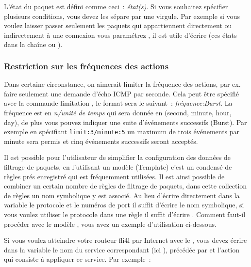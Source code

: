 L'état du paquet est défini comme ceci~: \emph{état(s)}.
Si vous souhaitez spécifier plusieurs conditions, vous devez les sépare par
une virgule. Par exemple si vous voulez laisser passer seulement les paquets
qui appartiennent directement ou indirectement à une connexion vous paramétrez
, il est utile d'écrire
(ces états dans la chaîne  ou ).

\subsubsection{Restriction sur les fréquences des actions}

Dans certaine circonstance, on aimerait limiter la fréquence des actions,
par ex. faire seulement une demande d'écho ICMP par seconde. Cela peut être
spécifié avec la commande limitation , le format sera le
suivant~: \emph{fréquence:Burst}. La fréquence est en
\emph{n/unité de temps} qui sera donnée en (second, minute, hour, day), de plus
vous pouvez indiquer une suite d'événements successifs (Burst). Par exemple en
spécifiant \texttt{limit:3/minute:5} un maximum de trois événements par minute
sera permis et cinq événements successifs seront acceptés.


Il est possible pour l'utilisateur de simplifier la configuration des données
de filtrage de paquets, en l'utilisant un modèle (Template) c'est un condensé
de règles prés enregistré qui est fréquemment utilisées. Il est ainsi possible de
combiner un certain nombre de règles de filtrage de paquets, dans cette
collection de règles un nom symbolique y est associé. Au lieu d'écrire directement
dans la variable le protocole et le numéros de port il suffit d'écrire le nom
symbolique, si vous voulez utiliser le protocole  dans une règle
il suffit d'écrire . Comment faut-il procéder avec le modèle
, vous avez un exemple d'utilisation ci-dessous.

Si vous voulez atteindre votre routeur fli4l par Internet avec le , vous
devez écrire dans la variable  le nom du service correspondant
(ici ), précédée par  et l'action qui consiste à
appliquer ce service. Par exemple~:

